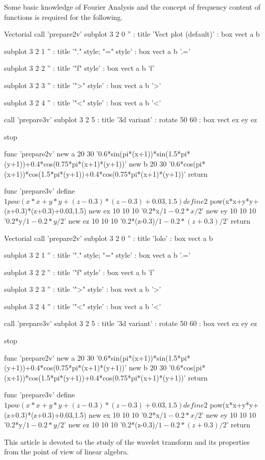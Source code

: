 \documentclass[letterpaper,10pt]{article}
\begin{document}
  Some basic knowledge of Fourier Analysis and the concept of frequency content of functions is required for the following.
  
  \begin{mglscript}{Vectorial}
    call 'prepare2v'
    subplot 3 2 0 '' : title 'Vect plot (default)' : box
    vect a b
    
    subplot 3 2 1 '' : title '"." style; "=" style' : box
    vect a b '.='
    
    subplot 3 2 2 '' : title '"f" style' : box
    vect a b 'f'
    
    subplot 3 2 3 '' : title '">" style' : box
    vect a b '>'
    
    subplot 3 2 4 '' : title '"<" style' : box
    vect a b '<'
    
    call 'prepare3v'
    subplot 3 2 5 : title '3d variant' : rotate 50 60 : box
    vect ex ey ez
    
    stop
    
func 'prepare2v'
  new a 20 30 '0.6*sin(pi*(x+1))*sin(1.5*pi*(y+1))+0.4*cos(0.75*pi*(x+1)*(y+1))'
  new b 20 30 '0.6*cos(pi*(x+1))*cos(1.5*pi*(y+1))+0.4*cos(0.75*pi*(x+1)*(y+1))'
return
    
func 'prepare3v'
  define $1 pow(x*x+y*y+(z-0.3)*(z-0.3)+0.03,1.5)
  define $2 pow(x*x+y*y+(z+0.3)*(z+0.3)+0.03,1.5)
  new ex 10 10 10 '0.2*x/$1-0.2*x/$2'
  new ey 10 10 10 '0.2*y/$1-0.2*y/$2'
  new ez 10 10 10 '0.2*(z-0.3)/$1-0.2*(z+0.3)/$2'
return
  \end{mglscript}
  \begin{mglscript}{Vectorial}
    call 'prepare2v'
    subplot 3 2 0 '' : title 'lolo' : box
    vect a b
    
    subplot 3 2 1 '' : title '"." style; "=" style' : box
    vect a b '.='
    
    subplot 3 2 2 '' : title '"f" style' : box
    vect a b 'f'
    
    subplot 3 2 3 '' : title '">" style' : box
    vect a b '>'
    
    subplot 3 2 4 '' : title '"<" style' : box
    vect a b '<'
    
    call 'prepare3v'
    subplot 3 2 5 : title '3d variant' : rotate 50 60 : box
    vect ex ey ez
    
    stop
    
func 'prepare2v'
  new a 20 30 '0.6*sin(pi*(x+1))*sin(1.5*pi*(y+1))+0.4*cos(0.75*pi*(x+1)*(y+1))'
  new b 20 30 '0.6*cos(pi*(x+1))*cos(1.5*pi*(y+1))+0.4*cos(0.75*pi*(x+1)*(y+1))'
return
    
func 'prepare3v'
  define $1 pow(x*x+y*y+(z-0.3)*(z-0.3)+0.03,1.5)
  define $2 pow(x*x+y*y+(z+0.3)*(z+0.3)+0.03,1.5)
  new ex 10 10 10 '0.2*x/$1-0.2*x/$2'
  new ey 10 10 10 '0.2*y/$1-0.2*y/$2'
  new ez 10 10 10 '0.2*(z-0.3)/$1-0.2*(z+0.3)/$2'
return
  \end{mglscript}
  \noindent This article is devoted to the study of the wavelet transform and its properties from the point of view of linear algebra.
  
\end{document}
